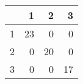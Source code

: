 \begin{tabular}{rrrr}
  \hline
 & 1 & 2 & 3 \\ 
  \hline
1 &  23 &   0 &   0 \\ 
  2 &   0 &  20 &   0 \\ 
  3 &   0 &   0 &  17 \\ 
   \hline
\end{tabular}
